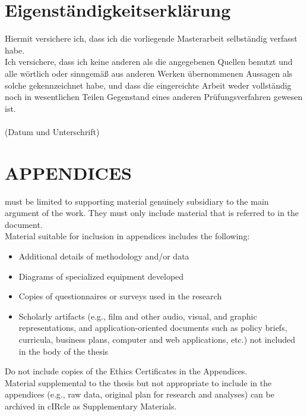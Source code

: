 \chapter*{Eigenständigkeitserklärung}
  Hiermit versichere ich, dass ich die vorliegende Masterarbeit selbständig verfasst habe. \\
  Ich versichere, dass ich keine anderen als die angegebenen Quellen benutzt und alle wörtlich oder sinngemäß aus anderen Werken übernommenen Aussagen als solche gekennzeichnet habe, und dass die eingereichte Arbeit weder vollständig noch in wesentlichen Teilen Gegenstand eines anderen Prüfungsverfahren gewesen ist. \\
  \vspace{2 cm} \\
  (Datum und Unterschrift)

\chapter{APPENDICES}
   must be limited to supporting material genuinely subsidiary to the main 
    argument of the work. They must only include material that is referred to in the document.\\
  Material suitable for inclusion in appendices includes the following:
  \begin{itemize} 
    \item Additional details of methodology and/or data
    \item Diagrams of specialized equipment developed
    \item Copies of questionnaires or surveys used in the research
    \item Scholarly artifacts (e.g., film and other audio, visual, and graphic representations, and 
      application-oriented documents such as policy briefs, curricula, business plans, computer and 
      web applications, etc.) not included in the body of the thesis
  \end{itemize}
  Do not include copies of the Ethics Certificates in the Appendices. \\
  Material supplemental to the thesis but not appropriate to include in the appendices (e.g., raw 
    data, original plan for research and analyses) can be archived in cIRcle as Supplementary 
    Materials.



